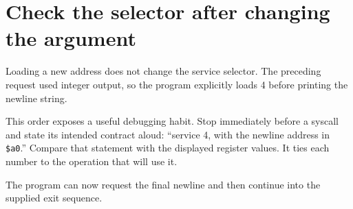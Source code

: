 \section{Check the selector after changing the
  argument}\label{001-console-calculation-p18-check-the-selector-after-changing-the-argument}

Loading a new address does not change the service selector. The
preceding request used integer output, so the program explicitly loads 4
before printing the newline string.

This order exposes a useful debugging habit. Stop immediately before a
syscall and state its intended contract aloud: ``service 4, with the
newline address in \texttt{\$a0}.'' Compare that statement with the
displayed register values. It ties each number to the operation that
will use it.

The program can now request the final newline and then continue into the
supplied exit sequence.

